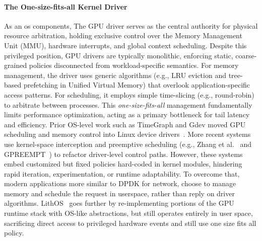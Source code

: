 \paragraph{The One-size-fits-all Kernel Driver}
As an os components, The GPU driver serves as the central authority for physical resource arbitration, holding exclusive control over the Memory Management Unit (MMU), hardware interrupts, and global context scheduling. Despite this privileged position, GPU drivers are typically monolithic, enforcing static, coarse-grained policies disconnected from workload-specific semantics. For memory management, the driver uses generic algorithms (e.g., LRU eviction and tree-based prefetching in Unified Virtual Memory) that overlook application-specific access patterns. For scheduling, it employs simple time-slicing (e.g., round-robin) to arbitrate between processes. This \emph{one-size-fits-all} management fundamentally limits performance optimization, acting as a primary bottleneck for tail latency and efficiency. 
    Prior OS-level work such as TimeGraph and Gdev moved GPU scheduling and memory control into Linux device drivers~\cite{kato2011timegraph,kato2012gdev}. More recent systems use kernel-space interception and preemptive scheduling (e.g., Zhang et al.~\cite{kernelintercept} and GPREEMPT~\cite{gpreempt}) to refactor driver-level control paths. However, these systems embed customized but fixed policies hard-coded in kernel modules, hindering rapid iteration, experimentation, or runtime adaptability. To overcome that, modern applications more similar to DPDK for network, choose to manage memory and schedule the request in userspace, rather than reply on driver algorithms.  LithOS~\cite{lithos} goes further by re-implementing portions of the GPU runtime stack with OS-like abstractions, but still operates entirely in user space, sacrificing direct access to privileged hardware events and still use one size fits all policy.


